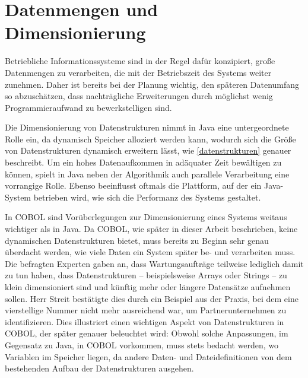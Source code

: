 \section{Datenmengen und Dimensionierung}

Betriebliche Informationssysteme sind in der Regel dafür konzipiert, große Datenmengen zu verarbeiten, die \idR mit der Betriebszeit des Systems weiter zunehmen. Daher ist bereits bei der Planung wichtig, den späteren Datenumfang so abzuschätzen, dass nachträgliche Erweiterungen durch möglichst wenig Programmieraufwand zu bewerkstelligen sind.

Die Dimensionierung von Datenstrukturen nimmt in Java eine untergeordnete Rolle ein, da dynamisch Speicher alloziert werden kann, wodurch sich die Größe von Datenstrukturen dynamisch erweitern lässt, wie \autoref{datenstrukturen} genauer beschreibt. Um ein hohes Datenaufkommen in adäquater Zeit bewältigen zu können, spielt in Java neben der Algorithmik auch parallele Verarbeitung eine vorrangige Rolle. Ebenso beeinflusst oftmals die Plattform, auf der ein Java-System betrieben wird, wie sich die Performanz des Systems gestaltet.

In COBOL sind Vorüberlegungen zur Dimensionierung eines Systems weitaus wichtiger als in Java. Da COBOL, wie später in dieser Arbeit beschrieben, keine dynamischen Datenstrukturen bietet, muss bereits zu Beginn sehr genau überdacht werden, wie viele Daten ein System später be- und verarbeiten muss. Die befragten Experten gaben an, dass  Wartungsaufträge teilweise lediglich damit zu tun haben, dass Datenstrukturen -- beispielsweise Arrays oder Strings -- zu klein dimensioniert sind und künftig mehr oder längere Datensätze aufnehmen sollen. Herr Streit bestätigte dies durch ein Beispiel aus der Praxis, bei dem eine vierstellige Nummer nicht mehr ausreichend war, um Partnerunternehmen zu identifizieren.  Dies illustriert einen wichtigen Aspekt von Datenstrukturen in COBOL, der später genauer beleuchtet wird: Obwohl solche Anpassungen, im Gegensatz zu Java, in COBOL vorkommen, muss stets bedacht werden, wo Variablen im Speicher liegen, da andere Daten- und Dateidefinitionen von dem bestehenden Aufbau der Datenstrukturen ausgehen.